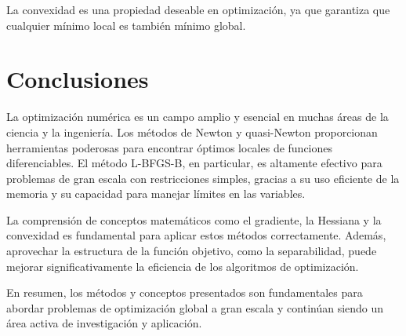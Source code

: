 La convexidad es una propiedad deseable en optimización, ya que garantiza que cualquier mínimo local es también mínimo global.

\section{Conclusiones}

La optimización numérica es un campo amplio y esencial en muchas áreas de la ciencia y la ingeniería. Los métodos de Newton y quasi-Newton proporcionan herramientas poderosas para encontrar óptimos locales de funciones diferenciables. El método L-BFGS-B, en particular, es altamente efectivo para problemas de gran escala con restricciones simples, gracias a su uso eficiente de la memoria y su capacidad para manejar límites en las variables.

La comprensión de conceptos matemáticos como el gradiente, la Hessiana y la convexidad es fundamental para aplicar estos métodos correctamente. Además, aprovechar la estructura de la función objetivo, como la separabilidad, puede mejorar significativamente la eficiencia de los algoritmos de optimización.

En resumen, los métodos y conceptos presentados son fundamentales para abordar problemas de optimización global a gran escala y continúan siendo un área activa de investigación y aplicación.

\endinput
